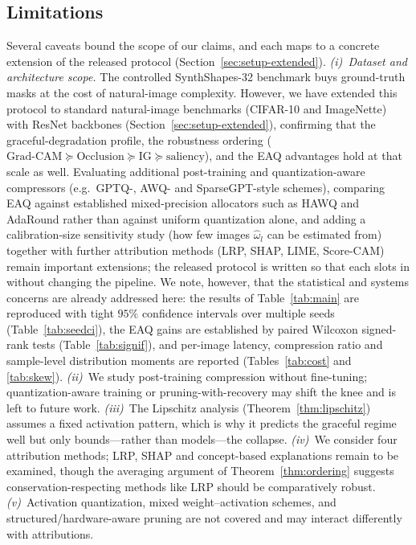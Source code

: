 \subsection{Limitations}
Several caveats bound the scope of our claims, and each maps to a concrete
extension of the released protocol (Section~\ref{sec:setup-extended}).
\emph{(i)~Dataset and architecture scope.} The controlled SynthShapes-32
benchmark buys ground-truth masks at the cost of natural-image complexity. However, we have extended this protocol to standard natural-image benchmarks (CIFAR-10 and ImageNette) with ResNet backbones (Section~\ref{sec:setup-extended}), confirming that the graceful-degradation profile, the robustness ordering ($\text{Grad-CAM}\succeq\text{Occlusion}\succeq\text{IG}\succeq\text{saliency}$), and the EAQ advantages hold at that scale as well. Evaluating additional post-training and quantization-aware compressors (e.g.\
GPTQ-, AWQ- and SparseGPT-style schemes), comparing EAQ against established
mixed-precision allocators such as HAWQ \cite{dong2019hawq} and AdaRound
\cite{nagel2020adaround} rather than against uniform
quantization alone, and adding a calibration-size sensitivity study (how few
images $\hat\omega_l$ can be estimated from) together with further attribution
methods (LRP, SHAP, LIME, Score-CAM) remain important extensions; the released
protocol is written so that each slots in without changing the pipeline. We note, however, that the
statistical and systems concerns are already addressed here: the results of
Table~\ref{tab:main} are reproduced with tight $95\%$ confidence intervals over
multiple seeds (Table~\ref{tab:seedci}), the EAQ gains are established by paired
Wilcoxon signed-rank tests (Table~\ref{tab:signif}), and per-image latency,
compression ratio and sample-level distribution moments are reported
(Tables~\ref{tab:cost} and \ref{tab:skew}). \emph{(ii)}~We study post-training compression without fine-tuning;
quantization-aware training or pruning-with-recovery may shift the knee and is
left to future work. \emph{(iii)}~The Lipschitz analysis
(Theorem~\ref{thm:lipschitz}) assumes a fixed activation pattern, which is why it
predicts the graceful regime well but only bounds---rather than models---the
collapse. \emph{(iv)}~We consider four attribution methods; LRP, SHAP and
concept-based explanations remain to be examined, though the averaging argument
of Theorem~\ref{thm:ordering} suggests conservation-respecting methods like LRP
should be comparatively robust. \emph{(v)}~Activation quantization, mixed
weight--activation schemes, and structured/hardware-aware pruning are not covered
and may interact differently with attributions.

